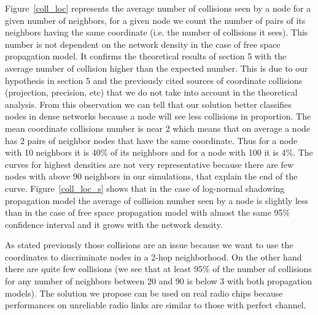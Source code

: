 \documentclass[a4paper]{article}
\begin{document}
Figure~\ref{coll_loc} represents the average number of collisions seen by a node for a given number of neighbors, for a given node we count the number of pairs of its neighbors having the same coordinate (i.e. the number of collisions it sees). This number is not dependent on the network density in the case of free space propagation model. It confirms the theoretical results of section 5 with the average number of collision higher than the expected number. This is due to our hypothesis in section 5 and the previously cited sources of coordinate collisions (projection, precision, etc) that we do not take into account in the theoretical analysis. From this observation we can tell that our solution better classifies nodes in dense networks because a node will see less collisions in proportion. The mean coordinate collisions number is near 2 which means that on average a node has 2 pairs of neighbor nodes that have the same coordinate. Thus for a node with 10 neighbors it is 40\% of its neighbors and for a node with 100 it is 4\%. The curves for highest densities are not very representative because there are few nodes with above 90 neighbors in our simulations, that explain the end of the curve. Figure~\ref{coll_loc_s} shows that in the case of log-normal shadowing propagation model the average of collision number seen by a node is slightly less than in the case of free space propagation model with almost the same 95\% confidence interval and it grows with the network density.

As stated previously those collisions are an issue because we want to use the coordinates to discriminate nodes in a 2-hop neighborhood. On the other hand there are quite few collisions (we see that at least 95\% of the number of collisions for any number of neighbors between 20 and 90 is below 3 with both propagation models). The solution we propose can be used on real radio chips because performances on unreliable radio links are similar to those with perfect channel.
\end{document}
